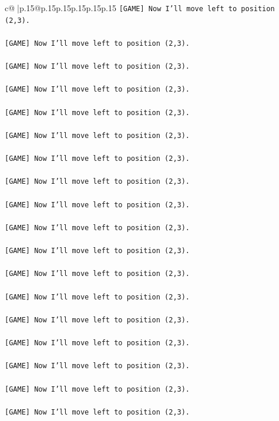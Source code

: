 \documentclass{article}
\begin{document}
{\begin{supertabular}{c@{$\;$}|p{.15\linewidth}@{}p{.15\linewidth}p{.15\linewidth}p{.15\linewidth}p{.15\linewidth}p{.15\linewidth}}
{{{\texttt{{[}GAME{]} Now I'll move left to position (2,3).} \\
\\ 
\texttt{{[}GAME{]} Now I'll move left to position (2,3).} \\
\\ 
\texttt{{[}GAME{]} Now I'll move left to position (2,3).} \\
\\ 
\texttt{{[}GAME{]} Now I'll move left to position (2,3).} \\
\\ 
\texttt{{[}GAME{]} Now I'll move left to position (2,3).} \\
\\ 
\texttt{{[}GAME{]} Now I'll move left to position (2,3).} \\
\\ 
\texttt{{[}GAME{]} Now I'll move left to position (2,3).} \\
\\ 
\texttt{{[}GAME{]} Now I'll move left to position (2,3).} \\
\\ 
\texttt{{[}GAME{]} Now I'll move left to position (2,3).} \\
\\ 
\texttt{{[}GAME{]} Now I'll move left to position (2,3).} \\
\\ 
\texttt{{[}GAME{]} Now I'll move left to position (2,3).} \\
\\ 
\texttt{{[}GAME{]} Now I'll move left to position (2,3).} \\
\\ 
\texttt{{[}GAME{]} Now I'll move left to position (2,3).} \\
\\ 
\texttt{{[}GAME{]} Now I'll move left to position (2,3).} \\
\\ 
\texttt{{[}GAME{]} Now I'll move left to position (2,3).} \\
\\ 
\texttt{{[}GAME{]} Now I'll move left to position (2,3).} \\
\\ 
\texttt{{[}GAME{]} Now I'll move left to position (2,3).} \\
\\ 
\texttt{{[}GAME{]} Now I'll move left to position (2,3).} \\
\\ 
}}}
\end{supertabular}}
\end{document}
